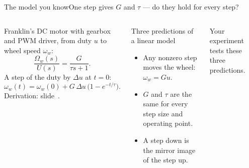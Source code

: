 %
\begin{frame}{The model you know}{One step gives $G$ and $\tau$ --- do they hold for every step?}
  \footnotesize
  \setlength{\abovedisplayskip}{3pt}\setlength{\belowdisplayskip}{3pt}
  \begin{columns}[T]
    Franklin's DC motor with gearbox and PWM driver, from duty $u$ to wheel speed $\omega_w$:
    \[
      \frac{\Omega_w(s)}{U(s)} = \frac{G}{\tau s + 1}.
    \]
    A step of the duty by $\Delta u$ at $t = 0$:
    \[
      \omega_w(t) = \omega_w(0) + G\,\Delta u\,\big(1 - e^{-t/\tau}\big).
    \]
    {\scriptsize Derivation: slide~\pageref{app:model}.}
    \begin{block}{\footnotesize Three predictions of a linear model}
      \small
      \begin{itemize}\setlength{\itemsep}{5pt}
        \item[\textbf{P1}] Any nonzero step moves the wheel: $\omega_w = Gu$.
        \item[\textbf{P2}] $G$ and $\tau$ are the same for every step size and operating point.
        \item[\textbf{P3}] A step down is the mirror image of the step up.
      \end{itemize}
    \end{block}
    \vspace{4pt}
    \alert{Your experiment tests these three predictions.}
  \end{columns}
\end{frame}
